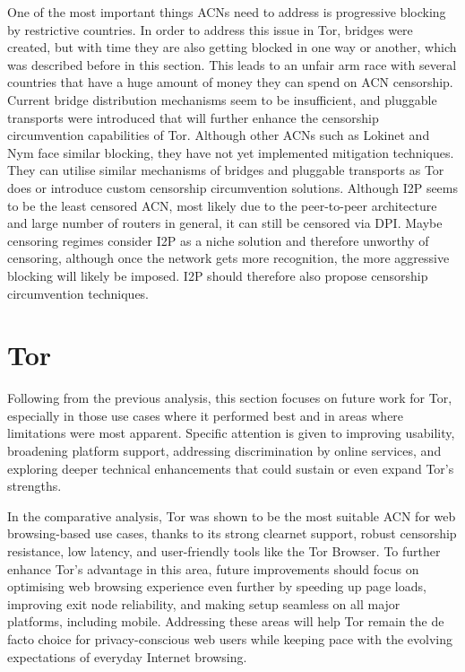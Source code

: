 One of the most important things ACNs need to address is progressive blocking by restrictive countries. In order to address this issue in Tor, bridges were created, but with time they are also getting blocked in one way or another, which was described before in this section. This leads to an unfair arm race with several countries that have a huge amount of money they can spend on ACN censorship. Current bridge distribution mechanisms seem to be insufficient, and pluggable transports were introduced that will further enhance the censorship circumvention capabilities of Tor.
Although other ACNs such as Lokinet and Nym face similar blocking, they have not yet implemented mitigation techniques. They can utilise similar mechanisms of bridges and pluggable transports as Tor does or introduce custom censorship circumvention solutions. Although I2P seems to be the least censored ACN, most likely due to the peer-to-peer architecture and large number of routers in general, it can still be censored via DPI. Maybe censoring regimes consider I2P as a niche solution and therefore unworthy of censoring, although once the network gets more recognition, the more aggressive blocking will likely be imposed. I2P should therefore also propose censorship circumvention techniques.

\section{Tor}

Following from the previous analysis, this section focuses on future work for Tor, especially in those use cases where it performed best and in areas where limitations were most apparent. Specific attention is given to improving usability, broadening platform support, addressing discrimination by online services, and exploring deeper technical enhancements that could sustain or even expand Tor’s strengths.

In the comparative analysis, Tor was shown to be the most suitable ACN for web browsing-based use cases, thanks to its strong clearnet support, robust censorship resistance, low latency, and user-friendly tools like the Tor Browser. To further enhance Tor’s advantage in this area, future improvements should focus on optimising web browsing experience even further by speeding up page loads, improving exit node reliability, and making setup seamless on all major platforms, including mobile. Addressing these areas will help Tor remain the de facto choice for privacy-conscious web users while keeping pace with the evolving expectations of everyday Internet browsing.

